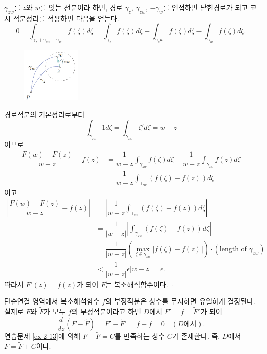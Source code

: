 $\gamma_{zw}$를 $z$와 $w$를 잇는 선분이라 하면,
경로 $\gamma_z$, $\gamma_{zw}$, $-\gamma_w$를 연접하면
닫힌경로가 되고 코시 적분정리를 적용하면 다음을 얻는다.
\[
0 = \int_{\gamma_z  + \gamma_{zw} - \gamma_w} f(\zeta)d\zeta
= \int_{\gamma_z} f(\zeta)d\zeta + \int_{\gamma_zw} f(\zeta)d\zeta
- \int_{\gamma_w} f(\zeta)d\zeta.
\]
\begin{figure}[h!]
\begin{center}
\includegraphics[width=0.25\textwidth]{./SaltChapter/fig-3-0-5}
\end{center}
\end{figure}

경로적분의 기본정리로부터
\[
\int_{\gamma_{zw}} 1d\zeta = \int_{\gamma_{zw}} \zeta'd\zeta = w - z
\]
이므로
\begin{align*}
\dfrac{F(w)-F(z)}{w-z} - f(z)
&= \dfrac1{w-z} \int_{\gamma_{zw}} f(\zeta)d\zeta 
- \dfrac1{w-z} \int_{\gamma_{zw}} f(z)d\zeta \\
&= \dfrac1{w-z} \int_{\gamma_{zw}} (f(\zeta) - f(z)) d\zeta
\end{align*}
이고
\begin{align*}
\left| \dfrac{F(w)-F(z)}{w-z} - f(z) \right|
&= \left| \dfrac1{w-z} \int_{\gamma_{zw}} (f(\zeta) - f(z)) d\zeta \right| \\
&= \dfrac1{|w-z|} \left| \int_{\gamma_{zw}} (f(\zeta) - f(z)) d\zeta \right| \\
&= \dfrac1{|w-z|} \left( \max_{\zeta\in\gamma_{zw}} |f(\zeta) - f(z)| \right) \cdot
(\text{length of }\gamma_{zw}) \\
&< \dfrac1{|w-z|} \epsilon |w-z| = \epsilon.
\end{align*}
따라서 $F'(z) = f(z)$가 되어 $F$는 복소해석함수이다.
\hfill $\square$

\begin{salt_remark} \label{remark-3-2}
단순연결 영역에서 복소해석함수 $f$의 부정적분은 상수를 무시하면 유일하게 결정된다.
실제로 $F$와 $\tilde F$가 모두 $f$의 부정적분이라고 하면
$D$에서 $F' = f = \tilde F'$가 되어
\[
\dfrac d{dz} (F- \tilde F) = F' - \tilde F' = f - f = 0 \quad (D\text{에서}).
\]
연습문제 \ref{ex-2-13}에 의해
$F-\tilde F= C$를 만족하는 상수 $C$가 존재한다.
즉, $D$에서 $F = \tilde F + C$이다.
\end{salt_remark}

